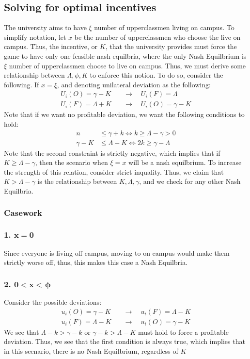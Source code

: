 \documentclass[12pt]{article}
\begin{document}
\subsection{Solving for optimal incentives}
The university aims to have $\xi$ number of upperclassmen living on campus. To simplify notation, let $x$ be the number of upperclassmen who choose the live on campus. Thus, the incentive, or $K$, that the university provides must force the game to have only one feasible nash equilbria, where the only Nash Equilbrium is  $\xi$ number of upperclassmen choose to live on campus. Thus, we must derive some relationship between $\Lambda, \phi, K$ to enforce this notion. To do so, consider the following. If $x = \xi$, and denoting unilateral deviation as the following:
\begin{align*}
    U_i(O) = \gamma + K \quad &\to \quad U_i(F) = \Lambda\\
    U_i(F) = \Lambda + K \quad &\to \quad U_i(O) = \gamma - K
\end{align*}
Note that if we want no profitable deviation, we want the following conditions to hold:
\begin{align*}
    n &\leq \gamma + k \iff k \geq \Lambda - \gamma > 0 \\
    \gamma - K & \leq \Lambda + K \iff 2k \geq \gamma - \Lambda
\end{align*}
Note that the second constraint is strictly negative, which implies that if $K \geq \Lambda - \gamma$, then the scenario when $\xi = x$ will be a nash equilbrium. To increase the strength of this relation, consider strict inquality. Thus, we claim that $K > \Lambda - \gamma$ is the relationship between $K, \Lambda, \gamma$, and we check for any other Nash Equilbria. 
\subsubsection{Casework}
\subsubsection*{1. $\mathbf{x = 0}$}
Since everyone is living off campus, moving to on campus would make them strictly worse off, thus, this makes this case a Nash Equilbria. 
\subsubsection*{2. $\mathbf{0 < x <} \hspace{1pt} \bm{\phi}$}
Consider the possible deviations:
\begin{align*}
    u_i(O) = \gamma - K \quad &\to \quad u_i(F) = \Lambda - K \\
    u_i(F) = \Lambda - K\quad &\to \quad u_i(O) = \gamma - K
\end{align*}
We see that $\Lambda - k > \gamma - k$ or $\gamma - k > \Lambda - K$ must hold to force a profitable deviation. Thus, we see that the first condition is always true, which implies that in this scenario, there is no Nash Equilbrium, regardless of $K$
\end{document}
